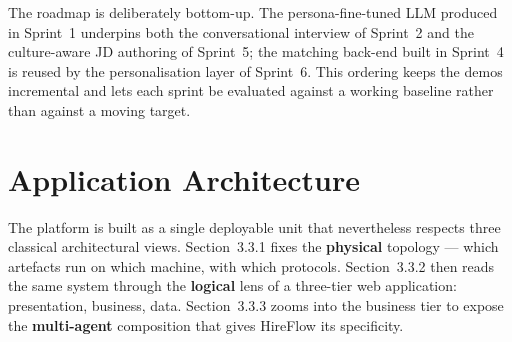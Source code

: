 \begin{table}[!htbp]
    \centering
    {\renewcommand{\arraystretch}{1.1}%
    }
    \caption{Six-sprint roadmap of the HireFlow internship.}
    \label{tab:sprints}
\end{table}

The roadmap is deliberately bottom-up. The persona-fine-tuned
\acs{LLM} produced in Sprint~1 underpins both the conversational
interview of Sprint~2 and the culture-aware \acs{JD} authoring of
Sprint~5; the matching back-end built in Sprint~4 is reused by the
personalisation layer of Sprint~6. This ordering keeps the demos
incremental and lets each sprint be evaluated against a working
baseline rather than against a moving target.

\section{Application Architecture}

The platform is built as a single deployable unit that nevertheless
respects three classical architectural views. Section~3.3.1 fixes
the \textbf{physical} topology --- which artefacts run on which
machine, with which protocols. Section~3.3.2 then reads the same
system through the \textbf{logical} lens of a three-tier web
application: presentation, business, data. Section~3.3.3 zooms into
the business tier to expose the \textbf{multi-agent} composition
that gives HireFlow its specificity.

